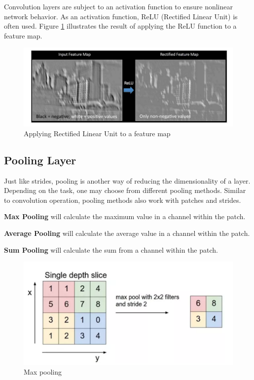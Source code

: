  Convolution layers are subject to an activation function to ensure nonlinear network behavior. 
 As an activation function, ReLU (Rectified Linear Unit) is often used. Figure \ref{fig:relu-exemple}
  illustrates the result of applying the ReLU function to a feature map.

  \begin{figure}[htbp]
    \centerline{\includegraphics[scale=0.75]{fig/relu.png}}  
    \caption{Applying Rectified Linear Unit to a feature map}
    \label{fig:relu-exemple}
  \end{figure}

\subsection{Pooling Layer}

Just like strides, pooling is another way of reducing the dimensionality of a layer.
Depending on the task, one may choose from different pooling methods.
Similar to convolution operation, pooling methods also
work with patches and strides. 


\textbf{Max Pooling} will calculate the maximum value in a channel within the patch.

\textbf{Average Pooling} will calculate the average value in a channel within the patch.

\textbf{Sum Pooling} will calculate the sum from a channel within the patch.


\begin{figure}[htbp]
  \centerline{\includegraphics[scale=0.75]{fig/max-pooling.png}}  
  \caption{Max pooling}
  \label{fig:max-pooling}
\end{figure}

